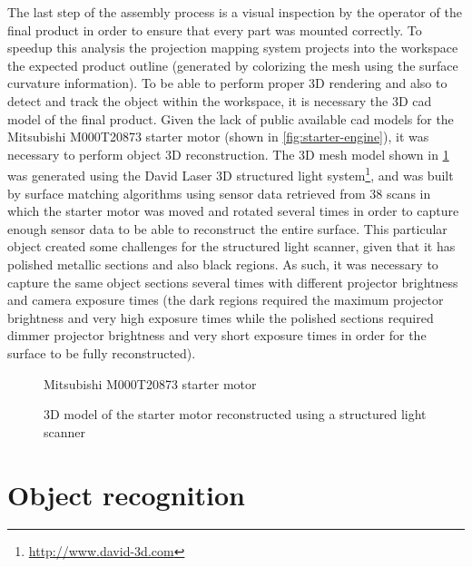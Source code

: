 The last step of the assembly process is a visual inspection by the operator of the final product in order to ensure that every part was mounted correctly. To speedup this analysis the projection mapping system projects into the workspace the expected product outline (generated by colorizing the mesh using the surface curvature information). To be able to perform proper 3D rendering and also to detect and track the object within the workspace, it is necessary the 3D \gls{cad} model of the final product. Given the lack of public available \gls{cad} models for the Mitsubishi M000T20873 starter motor (shown in \cref{fig:starter-engine}), it was necessary to perform object 3D reconstruction. The 3D mesh model shown in \cref{fig:object-reconstruction} was generated using the David Laser 3D structured light system\footnote{\url{http://www.david-3d.com}}, and was built by surface matching algorithms using sensor data retrieved from 38 scans in which the starter motor was moved and rotated several times in order to capture enough sensor data to be able to reconstruct the entire surface. This particular object created some challenges for the structured light scanner, given that it has polished metallic sections and also black regions. As such, it was necessary to capture the same object sections several times with different projector brightness and camera exposure times (the dark regions required the maximum projector brightness and very high exposure times while the polished sections required dimmer projector brightness and very short exposure times in order for the surface to be fully reconstructed).

\begin{figure}[H]
	\begin{floatrow}[2]
		{\caption{Mitsubishi M000T20873 starter motor}\label{fig:starter-engine}}
		{\caption{3D model of the starter motor reconstructed using a structured light scanner}\label{fig:object-reconstruction}}
	\end{floatrow}
\end{figure}



\section{Object recognition}


